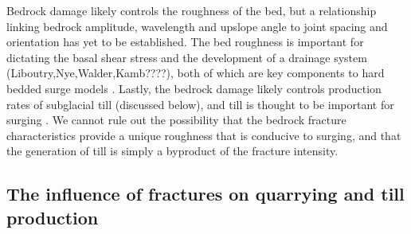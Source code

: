 \documentclass[review]{igs}
\begin{document}
Bedrock damage likely controls the roughness of the bed, but a relationship linking bedrock amplitude, wavelength and upslope angle to joint spacing and orientation has yet to be established. The bed roughness is important for dictating the basal shear stress \citep{Weertman1957} and the development of a drainage system (Liboutry,Nye,Walder,Kamb????), both of which are key components to hard bedded surge models \citep[e.g.][]{Fowler1987,Kamb1987}. Lastly, the bedrock damage likely controls production rates of subglacial till (discussed below), and till is thought to be important for surging \citep[e.g.][]{Harrison2003}. We cannot rule out the possibility that the bedrock fracture characteristics provide a unique roughness that is conducive to surging, and that the generation of till is simply a byproduct of the fracture intensity. 

%


\subsection{The influence of fractures on quarrying and till production}
\label{sec:quarry}
\end{document}
